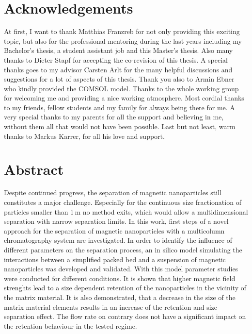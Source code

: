 \chapter*{Acknowledgements}

At first, I want to thank Matthias Franzreb for not only providing this exciting topic, but also for the professional mentoring during the last years including my Bachelor’s thesis, a student assistant job and this Master’s thesis.\newline 
Also many thanks to Dieter Stapf for accepting the co-revision of this thesis.\newline 
A special thanks goes to my advisor Carsten Arlt for the many helpful discussions and suggestions for a lot of aspects of this thesis.\newline 
Thank you also to Armin Ebner who kindly provided the COMSOL model.\newline 
Thanks to the whole working group for welcoming me and providing a nice working  atmosphere.\newline 
Most cordial thanks to my friends, fellow students and my family for always being there for me. A very special thanks to my parents for all the support and believing in me, without them all that would not have been possible. Last but not least, warm thanks to Markus Karrer, for all his love and support.

\newpage

\chapter{Abstract}
\label{ch:abstract_en}

Despite continued progress, the separation of magnetic nanoparticles still constitutes a major challenge. Especially for the continuous size fractionation of particles smaller than 1\,\textmu m no method exits, which would allow a multidimensional separation with narrow separation limits. In this work, first steps of a novel approach for the separation of magnetic nanoparticles with a multicolumn chromatography system are investigated. In order to identify the influence of different parameters on the separation process, an in silico model simulating the interactions between a simplified packed bed and a suspension of magnetic nanoparticles was developed and validated. With this model parameter studies were conducted for different conditions. It is shown that higher magnetic field strenghts lead to a size dependent retention of the nanoparticles in the vicinity of the matrix material. It is also demonstrated, that a decrease in the size of the matrix material elements results in an increase of the retention and size separation effect. The flow rate on contrary does not have a significant impact on the retention behaviour in the tested regime.  

